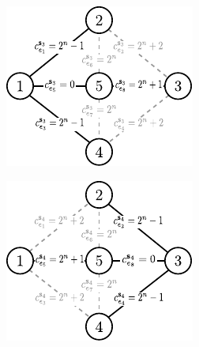\begin{figure}[!htbp]
	\null\hfill
	\begin{subfigure}[b]{0.3\textwidth}
		\includegraphics[width=\textwidth]{Chapter_II/MIN-MAX-REG2-example/a}
		\caption{}
		\label{fig:minmaxregexample2:a}
	\end{subfigure}
	\hfill
	\begin{subfigure}[b]{0.3\textwidth}
		\includegraphics[width=\textwidth]{Chapter_II/MIN-MAX-REG2-example/b}
		\caption{}

\end{subfigure}
\end{figure}
